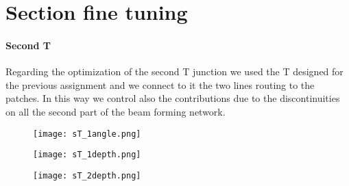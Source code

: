\section{Section fine tuning}


\paragraph{Second T}
Regarding the optimization of the second T junction we used the T designed for the previous assignment and we connect to it the two lines routing to the patches. In this way we control also the contributions due to the discontinuities on all the second part of the beam forming network.

\begin{figure}[H]
	\centering
	\texttt{[image: sT\_1angle.png]}
	\caption{}
	\label{sT_1angle}
\end{figure}
\begin{figure}[H]
	\centering
	\texttt{[image: sT\_1depth.png]}
	\caption{}
	\label{sT_1depth}
\end{figure}
\begin{figure}[H]
	\centering
	\texttt{[image: sT\_2depth.png]}
	\caption{}
	\label{sT_2depth}
\end{figure}